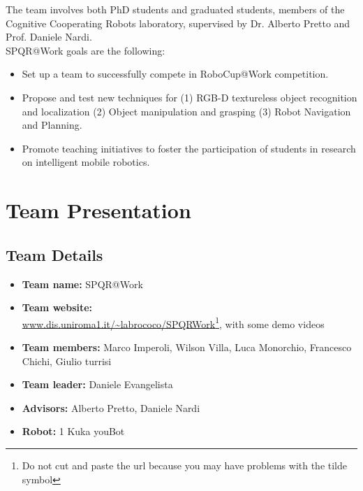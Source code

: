 \documentclass{llncs}
\begin{document}
The team involves both PhD students and graduated students, members of the Cognitive Cooperating Robots laboratory, supervised by Dr. Alberto Pretto and Prof. Daniele Nardi.\\ 

SPQR@Work goals are the following:
\begin{itemize}
 \item Set up a team to successfully compete in RoboCup@Work competition.
 \item Propose and test new techniques for (1) RGB-D textureless object recognition and localization (2) Object manipulation and grasping (3) Robot Navigation and Planning.
 \item Promote teaching initiatives to foster the participation of students in research on intelligent mobile robotics.
\end{itemize}
 
\section{Team Presentation}
\subsection{Team Details}

\begin{itemize}
 \item \textbf{Team name:} SPQR@Work
 \item \textbf{Team website:} \\\url{www.dis.uniroma1.it/~labrococo/SPQRWork}\footnote{Do not cut and paste the url because you may have problems with the tilde symbol}, with some demo videos
 \item \textbf{Team members:} Marco Imperoli, Wilson Villa, Luca Monorchio, Francesco Chichi, Giulio turrisi
  \item \textbf{Team leader:} Daniele Evangelista
 \item \textbf{Advisors:} Alberto Pretto, Daniele Nardi
 \item \textbf{Robot:} 1 Kuka youBot
\end{itemize}
\end{document}
